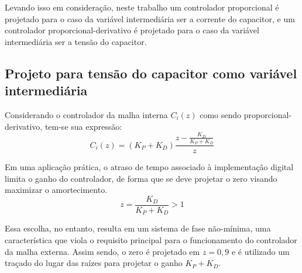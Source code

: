   Levando isso em consideração, neste trabalho um controlador proporcional é projetado para o caso da variável intermediária ser a corrente do capacitor, e um controlador proporcional-derivativo é projetado para o caso da variável intermediária ser a tensão do capacitor.


\subsection{Projeto para tensão do capacitor como variável intermediária}

  Considerando o controlador da malha interna $C_i(z)$ como sendo proporcional-derivativo, tem-se sua expressão:
  \begin{equation}
    C_i(z) = \left( K_P + K_D \right) \frac{z- \frac{K_D}{K_P+K_D}}{z}
  \end{equation}

  Em uma aplicação prática, o atraso de tempo associado à implementação digital limita o ganho do controlador, de forma que se deve projetar o zero visando maximizar o amortecimento.
  \begin{equation}
    z = \frac{K_D}{K_P+K_D} > 1
  \end{equation}

  Essa escolha, no entanto, resulta em um sistema de fase não-mínima, uma característica que viola o requisito principal para o funcionamento do controlador da malha externa. Assim sendo, o zero é projetado em $z=0,9$ e é utilizado um traçado do lugar das raízes para projetar o ganho $K_P+K_D$.

